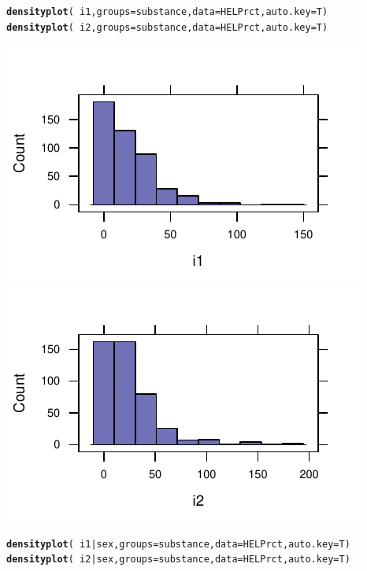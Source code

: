 \documentclass[twoside]{book}\usepackage[]{graphicx}\usepackage[]{xcolor}
\makeatletter
\def\maxwidth{ %
  \ifdim\Gin@nat@width>\linewidth
    \linewidth
  \else
    \Gin@nat@width
  \fi
}
\newcommand{\hlopt}[1]{\textcolor[rgb]{0,0,0}{#1}}%
\newcommand{\hlstd}[1]{\textcolor[rgb]{0.345,0.345,0.345}{#1}}%
\newcommand{\hlkwc}[1]{\textcolor[rgb]{0.333,0.667,0.333}{#1}}%
\newcommand{\hlkwd}[1]{\textcolor[rgb]{0.737,0.353,0.396}{\textbf{#1}}}%
\newenvironment{kframe}{%
 \def\at@end@of@kframe{}%
 \ifinner\ifhmode%
  \def\at@end@of@kframe{\end{minipage}}%
  \begin{minipage}{\columnwidth}%
 \fi\fi%
 \def\FrameCommand##1{\hskip\@totalleftmargin \hskip-\fboxsep
 \colorbox{shadecolor}{##1}\hskip-\fboxsep
     \hskip-\linewidth \hskip-\@totalleftmargin \hskip\columnwidth}%
 \MakeFramed {\advance\hsize-\width
   \@totalleftmargin\z@ \linewidth\hsize
   \@setminipage}}%
 {\par\unskip\endMakeFramed%
 \at@end@of@kframe}
\newenvironment{knitrout}{}{} %
\makeatother
\begin{document}
\begin{solution}
\begin{knitrout}
\color{fgcolor}\begin{kframe}
\begin{alltt}
\hlkwd{densityplot}\hlstd{(}\hlopt{~}\hlstd{i1,} \hlkwc{groups} \hlstd{= substance,} \hlkwc{data} \hlstd{= HELPrct,} \hlkwc{auto.key} \hlstd{= T)}
\hlkwd{densityplot}\hlstd{(}\hlopt{~}\hlstd{i2,} \hlkwc{groups} \hlstd{= substance,} \hlkwc{data} \hlstd{= HELPrct,} \hlkwc{auto.key} \hlstd{= T)}
\end{alltt}
\end{kframe}

{\centering \includegraphics[width=\maxwidth]{figures/fig-unnamed-chunk-33-1} 
\includegraphics[width=\maxwidth]{figures/fig-unnamed-chunk-33-2} 

}



\end{knitrout}
\begin{knitrout}
\color{fgcolor}\begin{kframe}
\begin{alltt}
\hlkwd{densityplot}\hlstd{(}\hlopt{~}\hlstd{i1} \hlopt{|} \hlstd{sex,} \hlkwc{groups} \hlstd{= substance,} \hlkwc{data} \hlstd{= HELPrct,} \hlkwc{auto.key} \hlstd{= T)}
\hlkwd{densityplot}\hlstd{(}\hlopt{~}\hlstd{i2} \hlopt{|} \hlstd{sex,} \hlkwc{groups} \hlstd{= substance,} \hlkwc{data} \hlstd{= HELPrct,} \hlkwc{auto.key} \hlstd{= T)}
\end{alltt}
\end{kframe}


\end{knitrout}
\end{solution}
\end{document}

